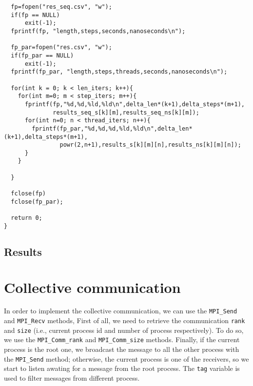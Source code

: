 \documentclass[a4paper]{article}
\begin{document}
\begin{verbatim}
  fp=fopen("res_seq.csv", "w");
  if(fp == NULL)
      exit(-1);
  fprintf(fp, "length,steps,seconds,nanoseconds\n");

  fp_par=fopen("res.csv", "w");
  if(fp_par == NULL)
      exit(-1);
  fprintf(fp_par, "length,steps,threads,seconds,nanoseconds\n");

  for(int k = 0; k < len_iters; k++){
    for(int m=0; m < step_iters; m++){
      fprintf(fp,"%d,%d,%ld,%ld\n",delta_len*(k+1),delta_steps*(m+1),
              results_seq_s[k][m],results_seq_ns[k][m]);
      for(int n=0; n < thread_iters; n++){
        fprintf(fp_par,"%d,%d,%d,%ld,%ld\n",delta_len*(k+1),delta_steps*(m+1),
                powr(2,n+1),results_s[k][m][n],results_ns[k][m][n]);
      }
    }

  }

  fclose(fp)
  fclose(fp_par);

  return 0;
}
\end{verbatim}

\subsection{Results}


\newpage

\section{Collective communication}

In order to implement the collective communication, we can use the \texttt{MPI\_Send} and \texttt{MPI\_Recv} methods, First of all, we need to retrieve the communication \texttt{rank} and \texttt{size} (i.e., current process id and number of process respectively). To do so, we use the \texttt{MPI\_Comm\_rank} and \texttt{MPI\_Comm\_size} methods. Finally, if the current process is the root one, we broadcast the message to all the other process with the \texttt{MPI\_Send} method; otherwise, the current process is one of the receivers, so we start to listen awating for a message from the root process. The \texttt{tag} variable is used to filter messages from different process.
\end{document}
